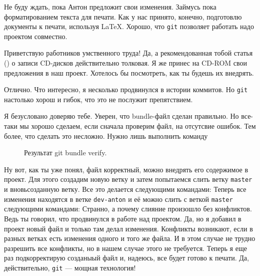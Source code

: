 \documentclass[14pt,a4paper]{article}
\begin{document}

 Не буду ждать, пока Антон предложит свои изменения. Займусь
пока форматированием текста для печати. Как у нас принято, конечно, подготовлю документы к печати,
используя \LaTeX. Хорошо, что \texttt{git} позволяет работать надо проектом совместно. 

 

 Приветствую работников умственного труда! Да, а рекомендованная тобой статья 
(\cite{bib:svyat-cdrecord}) о записи CD-дисков действительно толковая. Я же принес на CD-ROM свои 
предложения в наш проект. Хотелось бы посмотреть, как ты будешь их внедрять. 

 Отлично. Что интересно, я несколько продвинулся в истории коммитов. Но \texttt{git} 
настолько хорош и гибок, что это не послужит  препятствием. 


Я безусловано доверяю тебе. Уверен, что bundle-файл сделан правильно. Но все-таки 
мы хорошо сделаем, если сначала проверим файл, на отсутсвие ошибок. Тем более, что сделать это
несложно. Нужно лишь выполнить команду
\begin{figure}
	\centering
	\caption{Результат git bundle verify.}
	\label{pic-result-verify}
\end{figure}

Ну вот, как ты уже понял, файл корректный, можно внедрять его содержимое в проект.
Для этого создадим новую ветку и затем попытаемся слить ветку \texttt{master} и вновьсозданную ветку.
Все это делается следующими командами:
Теперь все изменения находятся в ветке \texttt{dev-anton} и её можно слить с веткой \texttt{master}
следующими командами:
 Странно, а почему слияние произошло без конфликтов. Ведь ты говорил, что продвинулся
в работе над проектом. 
 Да, но я добавил в проект новый файл и только там делал изменения. Конфликты
возникают, если в разных ветках есть изменения одного и того же файла. И в этом случае не трудно
разрешить все конфликты, но в нашем случае этого не требуется. Теперь я еще раз подкорректирую 
созданыый файл и, надеюсь, все будет готово к печати.
 Да, действительно, \texttt{git} --- мощная технология!
\end{document}
